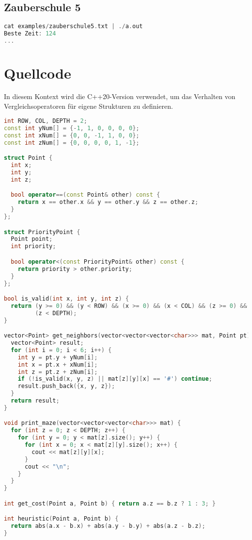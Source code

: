 \documentclass[a4paper,10pt,ngerman]{scrartcl}
\begin{document}
\subsection*{Zauberschule 5}
\begin{lstlisting}[language=C++]
cat examples/zauberschule5.txt | ./a.out
Beste Zeit: 124
...
\end{lstlisting}

\section{Quellcode}

In diesem Kontext wird die C++20-Version verwendet, um das Verhalten von Vergleichsoperatoren für eigene Strukturen zu definieren.

\begin{lstlisting}[language=C++]
int ROW, COL, DEPTH = 2;
const int yNum[] = {-1, 1, 0, 0, 0, 0};
const int xNum[] = {0, 0, -1, 1, 0, 0};
const int zNum[] = {0, 0, 0, 0, 1, -1};

struct Point {
  int x;
  int y;
  int z;

  bool operator==(const Point& other) const {
    return x == other.x && y == other.y && z == other.z;
  }
};

struct PriorityPoint {
  Point point;
  int priority;

  bool operator<(const PriorityPoint& other) const {
    return priority > other.priority;
  }
};

bool is_valid(int x, int y, int z) {
  return (y >= 0) && (y < ROW) && (x >= 0) && (x < COL) && (z >= 0) &&
         (z < DEPTH);
}

vector<Point> get_neighbors(vector<vector<vector<char>>> mat, Point pt) {
  vector<Point> result;
  for (int i = 0; i < 6; i++) {
    int y = pt.y + yNum[i];
    int x = pt.x + xNum[i];
    int z = pt.z + zNum[i];
    if (!is_valid(x, y, z) || mat[z][y][x] == '#') continue;
    result.push_back({x, y, z});
  }
  return result;
}

void print_maze(vector<vector<vector<char>>> mat) {
  for (int z = 0; z < DEPTH; z++) {
    for (int y = 0; y < mat[z].size(); y++) {
      for (int x = 0; x < mat[z][y].size(); x++) {
        cout << mat[z][y][x];
      }
      cout << "\n";
    }
  }
}

int get_cost(Point a, Point b) { return a.z == b.z ? 1 : 3; }

int heuristic(Point a, Point b) {
  return abs(a.x - b.x) + abs(a.y - b.y) + abs(a.z - b.z);
}


\end{lstlisting}
\end{document}
